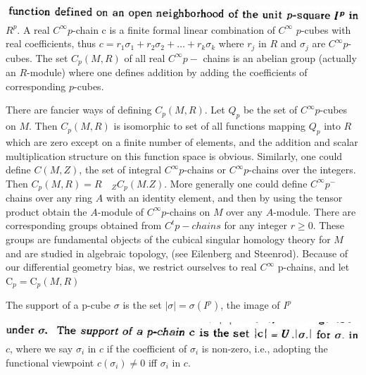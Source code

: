 \documentclass[10pt]{article}
\begin{document}
\includegraphics[max width=\textwidth]{2022_07_16_f4e476ee2159dc67e746g-53}\\
$R^{p}$. A real $C^{\infty} p$-chain $\mathrm{c}$ is a finite formal linear combination of $C^{\infty}$ $p$-cubes with real coefficients, thus $c=r_{1} \sigma_{1}+r_{2} \sigma_{2}+\ldots+r_{k} \sigma_{k}$ where $r_{j}$ in $R$ and $\sigma_{j}$ are $C^{\infty} p$-cubes. The set $C_{p}(M, R)$ of all real $C^{\infty} p-$ chains is an abelian group (actually an $R$-module) where one defines addition by adding the coefficients of corresponding $p$-cubes.

There are fancier ways of defining $C_{p}(M, R)$. Let $Q_{p}$ be the set of $C^{\infty} p$-cubes on $M$. Then $C_{p}(M, R)$ is isomorphic to set of all functions mapping $Q_{p}$ into $R$ which are zero except on a finite number of elements, and the addition and scalar multiplication structure on this function space is obvious. Similarly, one could define $C(M, Z)$, the set of integral $C^{\infty} p$-chains or $C^{\infty} p$-chains over the integers. Then $C_{p}(M, R)=R \quad{ }_{Z} C_{p}(M . Z)$. More generally one could define $C^{\infty} p^{-}$ chains over any ring $A$ with an identity element, and then by using the tensor product obtain the $A$-module of $C^{\infty} p$-chains on $M$ over any $A$-module. There are corresponding groups obtained from $C^{t} p-c h a i n s$ for any integer $r \geq 0$. These groups are fundamental objects of the cubical singular homology theory for $M$ and are studied in algebraic topology, (see Eilenberg and Steenrod). Because of our differential geometry bias, we restrict ourselves to real $C^{\infty}$ p-chains, and let $\mathrm{C}_{p}=\mathrm{C}_{p}(M, R)$

The support of a p-cube $\sigma$ is the set $|\sigma|=\sigma\left(I^{p}\right)$, the image of $I^{p}$

\includegraphics[max width=\textwidth]{2022_07_16_f4e476ee2159dc67e746g-53(1)}\\
$c$, where we say $\sigma_{i}$ in $c$ if the coefficient of $\sigma_{i}$ is non-zero, i.e., adopting the functional viewpoint $c\left(\sigma_{i}\right) \neq 0$ iff $\sigma_{i}$ in $c$.
\end{document}

